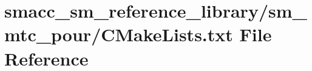 \hypertarget{sm__reference__library_2sm__mtc__pour_2CMakeLists_8txt}{}\section{smacc\+\_\+sm\+\_\+reference\+\_\+library/sm\+\_\+mtc\+\_\+pour/\+C\+Make\+Lists.txt File Reference}
\label{sm__reference__library_2sm__mtc__pour_2CMakeLists_8txt}
